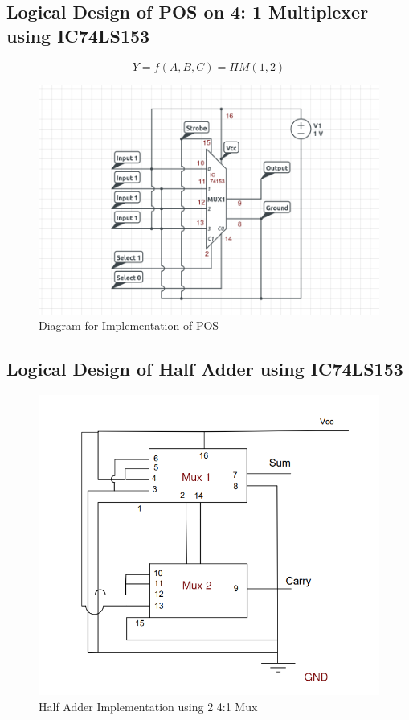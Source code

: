 \documentclass[11pt]{article}
\begin{document}
\subsection{Logical Design of POS on 4: 1 Multiplexer using IC74LS153}
$$
	Y = f(A, B, C) = \displaystyle\Pi M(1, 2)
$$
\begin{figure}[H]
	\centering
	\includegraphics[scale = 0.5]{pos.png}
	\caption{Diagram for Implementation of POS}
\end{figure}
\subsection{Logical Design of Half Adder using IC74LS153}
\begin{figure}[H]
	\centering
	\includegraphics[scale = 0.8]{half adder.png}
	\caption{Half Adder Implementation using 2 4:1 Mux}
\end{figure}
\end{document}
